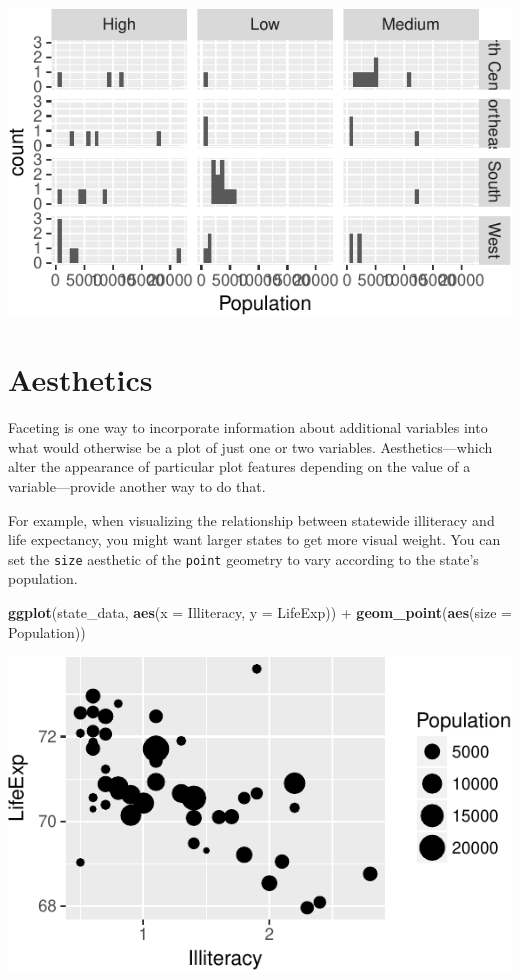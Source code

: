 \documentclass[12pt,oneside,openany]{tufte-book}
\newenvironment{Shaded}{}{}
\newcommand{\KeywordTok}[1]{\textcolor[rgb]{0.00,0.44,0.13}{\textbf{{#1}}}}
\newcommand{\DataTypeTok}[1]{\textcolor[rgb]{0.56,0.13,0.00}{{#1}}}
\newcommand{\StringTok}[1]{\textcolor[rgb]{0.25,0.44,0.63}{{#1}}}
\newcommand{\NormalTok}[1]{{#1}}
\begin{document}
\includegraphics{pdaps_files/figure-latex/facet-grid-1}

\section{Aesthetics}\label{aesthetics}

Faceting is one way to incorporate information about additional
variables into what would otherwise be a plot of just one or two
variables. Aesthetics---which alter the appearance of particular plot
features depending on the value of a variable---provide another way to
do that.

For example, when visualizing the relationship between statewide
illiteracy and life expectancy, you might want larger states to get more
visual weight. You can set the \texttt{size} aesthetic of the
\texttt{point} geometry to vary according to the state's population.

\begin{Shaded}
\begin{Highlighting}[]
\KeywordTok{ggplot}\NormalTok{(state_data, }\KeywordTok{aes}\NormalTok{(}\DataTypeTok{x =} \NormalTok{Illiteracy, }\DataTypeTok{y =} \NormalTok{LifeExp)) +}\StringTok{ }
\StringTok{    }\KeywordTok{geom_point}\NormalTok{(}\KeywordTok{aes}\NormalTok{(}\DataTypeTok{size =} \NormalTok{Population))}
\end{Highlighting}
\end{Shaded}

\includegraphics{pdaps_files/figure-latex/aes-size-1}
\end{document}
